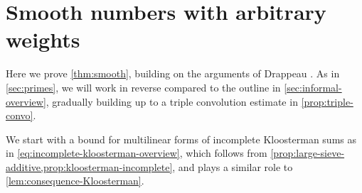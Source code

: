 \documentclass[reqno,11pt]{amsart}
\theoremstyle{remark}
\numberwithin{equation}{section}
\newcommand{\eps}{\varepsilon}
\begin{document}

\section{Smooth numbers with arbitrary weights} \label{sec:smooth} 

Here we prove \cref{thm:smooth}, building on the arguments of Drappeau \cite{drappeau2015theoremes}. As in \cref{sec:primes}, we will work in reverse compared to the outline in \cref{sec:informal-overview}, gradually building up to a triple convolution estimate in \cref{prop:triple-convo}.

We start with a bound for multilinear forms of incomplete Kloosterman sums as in \cref{eq:incomplete-kloosterman-overview}, which follows from \cref{prop:large-sieve-additive,prop:kloosterman-incomplete}, and plays a similar role to \cref{lem:consequence-Kloosterman}.
\end{document}
